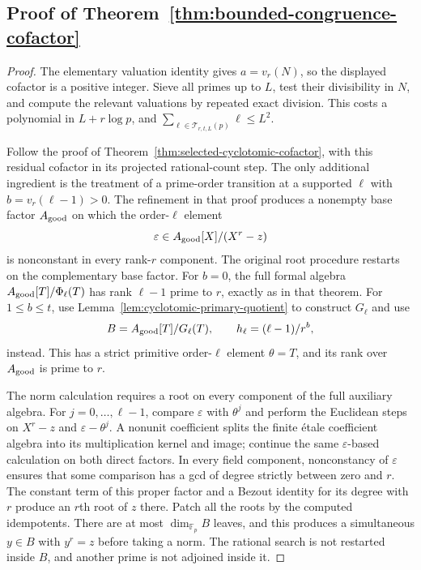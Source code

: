 \documentclass[11pt]{article}
\theoremstyle{definition}
\theoremstyle{remark}
\begin{document}
\subsection*{Proof of Theorem~\ref{thm:bounded-congruence-cofactor}}
\begin{proof}
The elementary valuation identity gives $a=v_r(N)$, so the displayed
cofactor is a positive integer.  Sieve all primes up to $L$, test their
divisibility in $N$, and compute the relevant valuations by repeated
exact division.  This costs a polynomial in $L+r\log p$, and
$\sum_{\ell\in\mathcal T_{r,t,L}(p)}\ell\leq L^2$.

Follow the proof of Theorem~\ref{thm:selected-cyclotomic-cofactor}, with
this residual cofactor in its projected rational-count step.
The only additional ingredient is the treatment of a prime-order
transition at a supported $\ell$ with $b=v_r(\ell-1)>0$.
The refinement in that proof produces a nonempty base factor $A_{\rm good}$
on which the order-$\ell$ element
\[
 \varepsilon\in A_{\rm good}[X]/(X^r-z)
\]
is nonconstant in every rank-$r$ component.  The original root procedure
restarts on the complementary base factor.
For $b=0$, the full formal algebra
$A_{\rm good}[T]/\Phi_\ell(T)$ has rank $\ell-1$ prime to $r$, exactly as
in that theorem.  For $1\leq b\leq t$, use
Lemma~\ref{lem:cyclotomic-primary-quotient} to construct $G_\ell$ and use
\[
 B=A_{\rm good}[T]/G_\ell(T),\qquad
 h_\ell=(\ell-1)/r^b,
\]
instead.  This has a strict primitive order-$\ell$ element $\theta=T$,
and its rank over $A_{\rm good}$ is prime to $r$.

The norm calculation requires a root on every component of the full
auxiliary algebra.  For $j=0,\ldots,\ell-1$, compare
$\varepsilon$ with $\theta^j$ and perform the Euclidean steps on
$X^r-z$ and $\varepsilon-\theta^j$.
A nonunit coefficient splits the finite \'etale coefficient algebra into
its multiplication kernel and image; continue the same
$\varepsilon$-based calculation on both direct factors.
In every field component, nonconstancy of $\varepsilon$ ensures that
some comparison has a gcd of degree strictly between zero and $r$.
The constant term of this proper factor and a Bezout identity for its
degree with $r$ produce an $r$th root of $z$ there.
Patch all the roots by the computed idempotents.  There are at most
$\dim_{\mathbb F_p}B$ leaves, and this produces a simultaneous $y\in B$
with $y^r=z$ before taking a norm.
The rational search is not restarted inside $B$, and another prime is
not adjoined inside it.


\end{proof}
\end{document}
